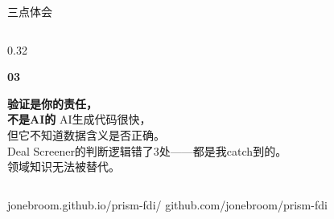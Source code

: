 \documentclass[aspectratio=169,11pt]{beamer}
\begin{document}
{\begin{frame}[plain]{三点体会}
\begin{columns}[T]
\begin{column}{0.32\linewidth}
\begin{tcolorbox}[colback=prismgreen!30, colframe=prismgreen,
        arc=5pt, left=8pt, right=8pt, top=8pt, bottom=8pt,
        height=7cm, valign=top]
        \begin{center}
          \Large\color{prismgreen}\bfseries 03
        \end{center}
        \vspace{0.3em}
        \textbf{\color{white}验证是你的责任，\\不是AI的}
        \vspace{0.5em}
        \color{prismline}\small
        AI生成代码很快，\\但它不知道数据含义是否正确。\\[0.3em]
        Deal Screener的判断逻辑错了3处——都是我catch到的。\\[0.3em]
        领域知识无法被替代。
      \end{tcolorbox}
    \end{column}
  \end{columns}
  \vspace{0.4cm}
  \begin{center}
    {\color{prismsoft}\small\faGlobe\;
    jonebroom.github.io/prism-fdi/ \quad
    \faGithub\; github.com/jonebroom/prism-fdi}
  \end{center}
\end{frame}
}
\end{document}
